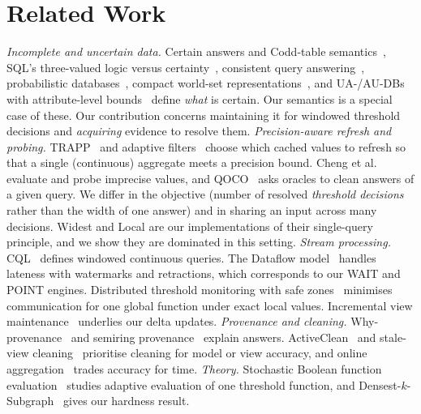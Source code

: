 \documentclass[conference]{IEEEtran}
\begin{document}
\section{Related Work}
\label{sec:related}
\emph{Incomplete and uncertain data.} Certain answers and Codd-table semantics~\cite{imielinski1984}, SQL's
three-valued logic versus certainty~\cite{libkin2016}, consistent query answering~\cite{arenas1999}, probabilistic
databases~\cite{dalvi2004}, compact world-set representations~\cite{antova2007}, and UA-/AU-DBs with attribute-level
bounds~\cite{feng2019uadb,feng2021audb} define \emph{what} is certain. Our semantics is a special case of these. Our
contribution concerns maintaining it for windowed threshold decisions and \emph{acquiring} evidence to resolve them.
\emph{Precision-aware refresh and probing.} TRAPP~\cite{olston2000trapp} and adaptive filters~\cite{olston2003filters}
choose which cached values to refresh so that a single (continuous) aggregate meets a precision bound. Cheng et
al.~\cite{cheng2003} evaluate and probe imprecise values, and QOCO~\cite{bergman2015qoco} asks oracles to clean answers of
a given query. We differ in the objective (number of resolved \emph{threshold decisions} rather than the width of one answer) and in
sharing an input across many decisions. Widest and Local are our implementations of their single-query
principle, and we show they are dominated in this setting.
\emph{Stream processing.} CQL~\cite{arasu2006cql} defines windowed continuous queries. The Dataflow
model~\cite{akidau2015dataflow} handles lateness with watermarks and retractions, which corresponds to our WAIT and POINT
engines. Distributed threshold monitoring with safe zones~\cite{sharfman2006} minimises communication for one global
function under exact local values. Incremental view maintenance~\cite{gupta1993} underlies our delta updates.
\emph{Provenance and cleaning.} Why-provenance~\cite{buneman2001} and semiring provenance~\cite{green2007} explain
answers. ActiveClean~\cite{krishnan2016activeclean} and stale-view cleaning~\cite{krishnan2015stale} prioritise cleaning
for model or view accuracy, and online aggregation~\cite{hellerstein1997online} trades accuracy for time.
\emph{Theory.} Stochastic Boolean function evaluation~\cite{deshpande2014sbfe} studies adaptive evaluation of one
threshold function, and Densest-$k$-Subgraph~\cite{feige2001dks} gives our hardness result.
\end{document}
